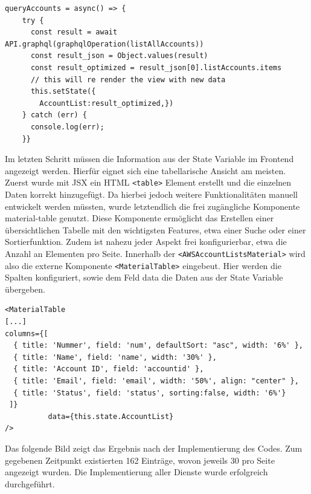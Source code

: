 \begin{lstlisting}[basicstyle=\ttfamily\small, breaklines=true , frame = single, backgroundcolor=\color{flashwhite},caption={Abruf der Daten und Speicherung in State Variable (Datei: \textit{\nameref{lst:React AccountList}} )} ]
queryAccounts = async() => {
    try {
      const result = await API.graphql(graphqlOperation(listAllAccounts))
      const result_json = Object.values(result)
      const result_optimized = result_json[0].listAccounts.items
      // this will re render the view with new data
      this.setState({
        AccountList:result_optimized,})
    } catch (err) {
      console.log(err);
    }}
\end{lstlisting}


Im letzten Schritt müssen die Information aus der State Variable im Frontend angezeigt werden.
Hierfür eignet sich eine tabellarische Ansicht am meisten.
Zuerst wurde mit JSX ein HTML \verb+<table>+ Element erstellt und die einzelnen Daten korrekt hinzugefügt.
Da hierbei jedoch weitere Funktionalitäten manuell entwickelt werden müssten, wurde letztendlich die frei zugängliche Komponente \glqq material-table\grqq{} genutzt.
Diese Komponente ermöglicht das Erstellen einer übersichtlichen Tabelle mit den wichtigsten Features, etwa einer Suche oder einer Sortierfunktion.
Zudem ist nahezu jeder Aspekt frei konfigurierbar, etwa die Anzahl an Elementen pro Seite.\cite[]{MaterialTable}
Innerhalb der \verb+<AWSAccountListsMaterial>+ wird also die externe Komponente \verb+<MaterialTable>+ eingebeut.
Hier werden die Spalten konfiguriert, sowie dem Feld \glqq data\grqq{} die Daten aus der State Variable übergeben.

\begin{lstlisting}[basicstyle=\ttfamily\small, breaklines=true , frame = single, backgroundcolor=\color{flashwhite} ]
<MaterialTable
[...]
columns={[
  { title: 'Nummer', field: 'num', defaultSort: "asc", width: '6%' },
  { title: 'Name', field: 'name', width: '30%' },
  { title: 'Account ID', field: 'accountid' },
  { title: 'Email', field: 'email', width: '50%', align: "center" },
  { title: 'Status', field: 'status', sorting:false, width: '6%'}
 ]}
          data={this.state.AccountList}
/>
    \end{lstlisting}


 Das folgende Bild zeigt das Ergebnis nach der Implementierung des Codes.
 Zum gegebenen Zeitpunkt existierten 162 Einträge, wovon jeweils 30 pro Seite angezeigt wurden.
 Die Implementierung aller Dienste wurde erfolgreich durchgeführt.

